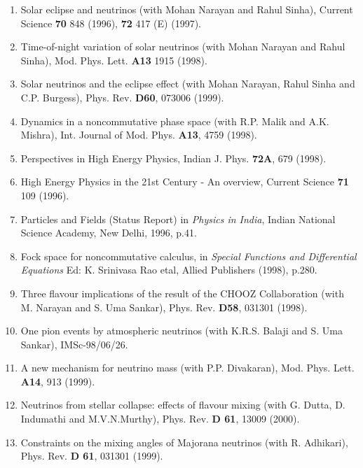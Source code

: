 \begin{enumerate}
\item Solar eclipse and neutrinos (with Mohan Narayan and Ra\-hul Sinha), 
Current Science {\bf 70} 848 (1996), {\bf 72} 417 (E) (1997).

\item Time-of-night variation of solar neutrinos (with Mohan Narayan and
Rahul Sinha), Mod. Phys. Lett. {\bf A13} 1915 (1998).

\item Solar neutrinos and the eclipse effect (with Mohan Nara\-yan,  Rahul
Sinha and C.P. Burgess), Phys. Rev. {\bf D60}, 073006 (1999).
\newpage
\item Dynamics in a noncommutative phase space (with R.P. Malik and A.K.
Mishra), Int. Journal of Mod. Phys. {\bf A13}, 4759 (1998).

\item Perspectives in High Energy Physics, Indian J. Phys. {\bf 72A}, 
679 (1998).

\item High Energy Physics in the 21st Century - An overview, Current
Science {\bf 71} 109 (1996).

\item Particles and Fields (Status Report) in {\it {Physics in
India}}, Indian National Science Academy, New Delhi, 1996, p.41.

\item Fock space for noncommutative calculus, in {\it Special Functions
and Differential Equations} Ed: K. Srinivasa Rao etal, Allied Publishers
(1998), p.280.

\item Three flavour implications of the result of the CHOOZ
Collaboration (with M. Narayan and S. Uma Sankar), Phys. Rev. {\bf D58}, 
031301 (1998).

\item One pion events by atmospheric neutrinos (with K.R.S. Ba\-laji and
S. Uma Sankar), IMSc-98/06/26.

\item A new mechanism for neutrino mass (with P.P. Divakaran), Mod.
Phys. Lett. {\bf A14}, 913 (1999).

\item Neutrinos from stellar collapse: effects of flavour mixing (with
G. Dutta, D. Indumathi and M.V.N.Murthy), Phys. Rev. {\bf D 61}, 13009
(2000).

\item Constraints on the mixing angles of Majorana neutrinos (with R.
Adhikari), Phys. Rev. {\bf D 61}, 031301 (1999). 


\end{enumerate}
